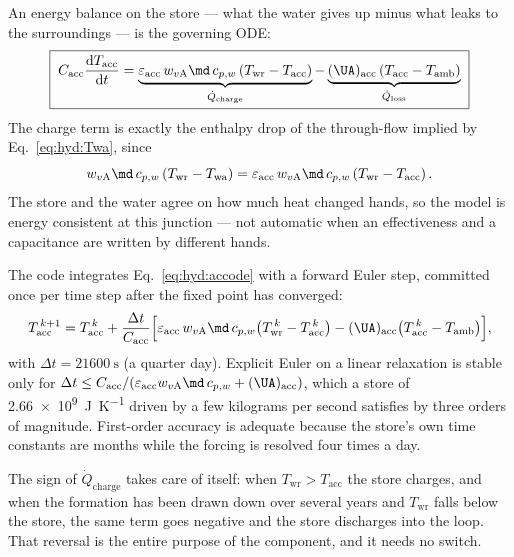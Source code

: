 An energy balance on the store --- what the water gives up minus what leaks to the surroundings
--- is the governing ODE:
\begin{equation}
\boxed{\;
C_{\mathrm{acc}}\frac{\mathrm{d}T_{\mathrm{acc}}}{\mathrm{d}t}
=\underbrace{\varepsilon_{\mathrm{acc}}\,w_{v\mathrm{A}}\md\,c_{p,w}
\left(T_{\mathrm{wr}}-T_{\mathrm{acc}}\right)}_{\dot Q_{\mathrm{charge}}}
-\underbrace{(\UA)_{\mathrm{acc}}\left(T_{\mathrm{acc}}-T_{\mathrm{amb}}\right)}
_{\dot Q_{\mathrm{loss}}}\;}
\label{eq:hyd:accode}
\end{equation}
The charge term is exactly the enthalpy drop of the through-flow implied by
Eq.~\eqref{eq:hyd:Twa}, since
\begin{equation*}
w_{v\mathrm{A}}\md\,c_{p,w}\left(T_{\mathrm{wr}}-T_{\mathrm{wa}}\right)
=\varepsilon_{\mathrm{acc}}\,w_{v\mathrm{A}}\md\,c_{p,w}
\left(T_{\mathrm{wr}}-T_{\mathrm{acc}}\right).
\end{equation*}
The store and the water agree on how much heat changed hands, so the model is energy consistent
at this junction --- not automatic when an effectiveness and a capacitance are written by
different hands.

The code integrates Eq.~\eqref{eq:hyd:accode} with a forward Euler step, committed once per
time step after the fixed point has converged:
\begin{equation}
T_{\mathrm{acc}}^{\,k+1}=T_{\mathrm{acc}}^{\,k}
+\frac{\Delta t}{C_{\mathrm{acc}}}
\Big[\varepsilon_{\mathrm{acc}}\,w_{v\mathrm{A}}\md\,c_{p,w}
\big(T_{\mathrm{wr}}^{\,k}-T_{\mathrm{acc}}^{\,k}\big)
-(\UA)_{\mathrm{acc}}\big(T_{\mathrm{acc}}^{\,k}-T_{\mathrm{amb}}\big)\Big],
\label{eq:hyd:accupdate}
\end{equation}
with $\Delta t=\SI{21600}{\second}$ (a quarter day). Explicit Euler on a linear relaxation is
stable only for $\Delta t\le C_{\mathrm{acc}}/
(\varepsilon_{\mathrm{acc}}w_{v\mathrm{A}}\md\,c_{p,w}+(\UA)_{\mathrm{acc}})$, which a store of
\SI{2.66e9}{\joule\per\kelvin} driven by a few kilograms per second satisfies by three orders
of magnitude. First-order accuracy is adequate because the store's own time constants are
months while the forcing is resolved four times a day.

The sign of $\dot Q_{\mathrm{charge}}$ takes care of itself: when
$T_{\mathrm{wr}}>T_{\mathrm{acc}}$ the store charges, and when the formation has been drawn
down over several years and $T_{\mathrm{wr}}$ falls below the store, the same term goes
negative and the store discharges into the loop. That reversal is the entire purpose of the
component, and it needs no switch.

